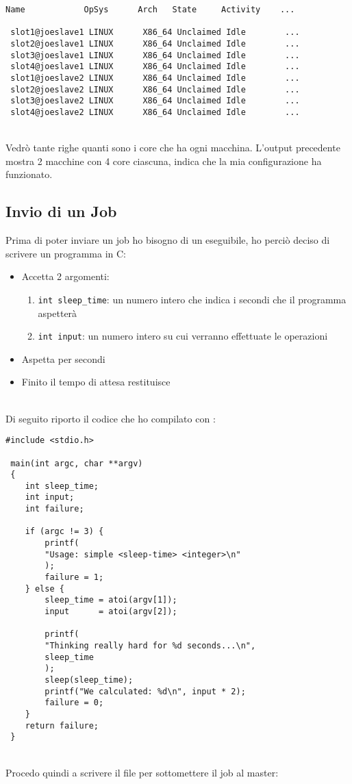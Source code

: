 \begin{lstlisting}[style=output]
 Name            OpSys      Arch   State     Activity    ...
 
 slot1@joeslave1 LINUX      X86_64 Unclaimed Idle        ...
 slot2@joeslave1 LINUX      X86_64 Unclaimed Idle        ...
 slot3@joeslave1 LINUX      X86_64 Unclaimed Idle        ...
 slot4@joeslave1 LINUX      X86_64 Unclaimed Idle        ...
 slot1@joeslave2 LINUX      X86_64 Unclaimed Idle        ...
 slot2@joeslave2 LINUX      X86_64 Unclaimed Idle        ...
 slot3@joeslave2 LINUX      X86_64 Unclaimed Idle        ...
 slot4@joeslave2 LINUX      X86_64 Unclaimed Idle        ...
\end{lstlisting}
\ \\
Vedr\`{o} tante righe quanti sono i core che ha ogni macchina. L'output precedente mostra 2 macchine con 4 core ciascuna, indica che la mia configurazione ha funzionato.

\subsection{Invio di un Job}

Prima di poter inviare un job ho bisogno di un eseguibile, ho perci\`{o} deciso di scrivere un programma in C: 

\begin{itemize}
	\item Accetta 2 argomenti:
	\begin{enumerate}
		\item \lstinline[style=c]|int sleep_time|: un numero intero che indica i secondi che il programma aspetter\`{a}
		\item \lstinline[style=c]|int input|: un numero intero su cui verranno effettuate le operazioni
	\end{enumerate}
	\item Aspetta per  secondi
	\item Finito il tempo di attesa restituisce 
\end{itemize}
\ \\
Di seguito riporto il codice che ho compilato con :

\begin{lstlisting}[style=c]
 #include <stdio.h>
 
 main(int argc, char **argv)
 {
	int sleep_time;
	int input;
	int failure;
	
	if (argc != 3) {
		printf(
		"Usage: simple <sleep-time> <integer>\n"
		);
		failure = 1;
	} else {
		sleep_time = atoi(argv[1]);
		input      = atoi(argv[2]);
		
		printf(
		"Thinking really hard for %d seconds...\n",
		sleep_time
		);
		sleep(sleep_time);
		printf("We calculated: %d\n", input * 2);
		failure = 0;
	}
	return failure;
 }
\end{lstlisting}
\ \\
Procedo quindi a scrivere il file  per sottomettere il job al master: 

